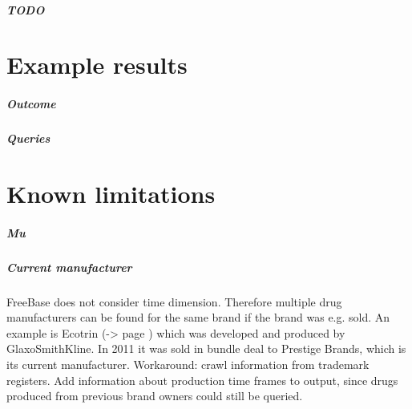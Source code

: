 \documentclass[11pt,titlepage,oneside,openany]{book}
\begin{document}
\paragraph{TODO}
\label{sec:TODO}


\chapter{Example results}
\label{cha:example}

\paragraph{Outcome}
\label{sec:outcome}

\paragraph{Queries}
\label{sec:query}



\label{ex:ecotrin}


\chapter{Known limitations}
\label{cha:limiations}



\paragraph{Mu}



\paragraph{Current manufacturer}
FreeBase does not consider time dimension. Therefore multiple drug manufacturers can be found for the same brand if the brand was e.g. sold. An example is Ecotrin (-> page \pageref{ex:ecotrin}) which was developed and produced by GlaxoSmithKline. In 2011 it was sold in bundle deal to Prestige Brands, which is its current manufacturer.
Workaround: crawl information from trademark registers. Add information about production time frames to output, since drugs produced from previous brand owners could still be queried.
\end{document}
